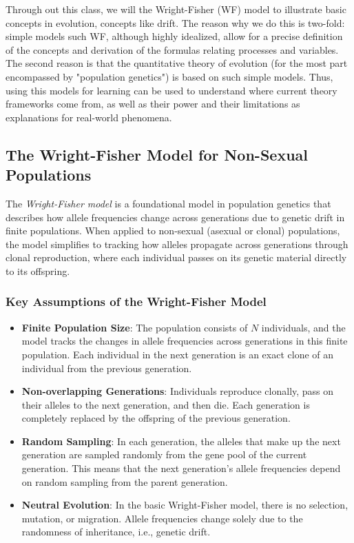 \documentclass[10pt,a4paper]{scrbook}
\begin{document}
Through out this class, we will the Wright-Fisher (WF) model to illustrate basic concepts in evolution, concepts like drift. The reason why we do this is two-fold:  simple models such WF, although highly idealized, allow for a precise definition of the concepts and derivation of the formulas relating processes and variables. The second reason is that the quantitative theory of evolution (for the most part encompassed by "population genetics") is based on such simple models. Thus, using this models for learning can be used to understand where current theory frameworks come from, as well as their power and their limitations as explanations for real-world phenomena.

\subsection{The Wright-Fisher Model for Non-Sexual Populations}

The \textit{Wright-Fisher model} is a foundational model in population genetics that describes how allele frequencies change across generations due to genetic drift in finite populations. When applied to non-sexual (asexual or clonal) populations, the model simplifies to tracking how alleles propagate across generations through clonal reproduction, where each individual passes on its genetic material directly to its offspring.

\subsubsection{Key Assumptions of the Wright-Fisher Model}

\begin{itemize}
    \item \textbf{Finite Population Size}: The population consists of \(N\) individuals, and the model tracks the changes in allele frequencies across generations in this finite population. Each individual in the next generation is an exact clone of an individual from the previous generation.
    
    \item \textbf{Non-overlapping Generations}: Individuals reproduce clonally, pass on their alleles to the next generation, and then die. Each generation is completely replaced by the offspring of the previous generation.
    
    \item \textbf{Random Sampling}: In each generation, the alleles that make up the next generation are sampled randomly from the gene pool of the current generation. This means that the next generation's allele frequencies depend on random sampling from the parent generation.
    
    \item \textbf{Neutral Evolution}: In the basic Wright-Fisher model, there is no selection, mutation, or migration. Allele frequencies change solely due to the randomness of inheritance, i.e., genetic drift.
\end{itemize}
\end{document}
